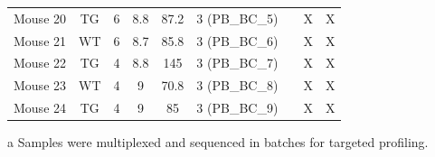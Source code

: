 \begin{landscape}
\begin{table}[]
{\begin{threeparttable}
\begin{tabular}{@{}ccccccccc@{}}
	Mouse 20   & TG  & 6  & 8.8  & 87.2     & 3 (PB\_BC\_5)  &                  & X              & X                    \\
	Mouse 21   & WT  & 6  & 8.7  & 85.8     & 3 (PB\_BC\_6)  &                  & X              & X                    \\
	Mouse 22   & TG  & 4  & 8.8  & 145      & 3 (PB\_BC\_7)  &                  & X              & X                    \\
	Mouse 23   & WT  & 4  & 9    & 70.8     & 3 (PB\_BC\_8)  &                  & X              & X                    \\
	Mouse 24   & TG  & 4  & 9    & 85       & 3 (PB\_BC\_9)  &                  & X              & X                    \\ \bottomrule
\end{tabular}
	\begin{tablenotes}
	\footnotesize
	\item[a] Samples were multiplexed and sequenced in batches for targeted profiling.
\end{tablenotes}
\end{threeparttable}%
}
\end{table}
\end{landscape}
\restoregeometry

